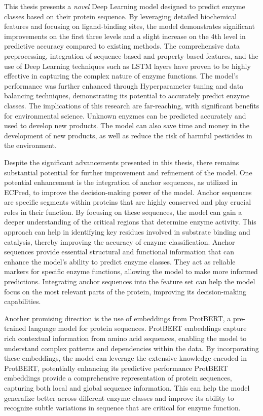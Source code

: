 This thesis presents a \textit{novel} Deep Learning model designed to predict enzyme classes based on their protein sequence. By leveraging detailed biochemical features and focusing on ligand-binding sites, the model demonstrates significant improvements on the first three levels and a slight increase on the 4th level in predictive accuracy compared to existing methods. The comprehensive data preprocessing, integration of sequence-based and property-based features, and the use of Deep Learning techniques such as LSTM layers have proven to be highly effective in capturing the complex nature of enzyme functions. The model's performance was further enhanced through Hyperparameter tuning and data balancing techniques, demonstrating its potential to accurately predict enzyme classes. The implications of this research are far-reaching, with significant benefits for environmental science. Unknown enyzmes can be predicted accurately and used to develop new products. The model can also save time and money in the development of new products, as well as reduce the risk of harmful pesticides in the environment.

Despite the significant advancements presented in this thesis, there remains substantial potential for further improvement and refinement of the model. One potential enhancement is the integration of anchor sequences, as utilized in ECPred, to improve the decision-making power of the model. Anchor sequences are specific segments within proteins that are highly conserved and play crucial roles in their function. By focusing on these sequences, the model can gain a deeper understanding of the critical regions that determine enzyme activity. This approach can help in identifying key residues involved in substrate binding and catalysis, thereby improving the accuracy of enzyme classification. Anchor sequences provide essential structural and functional information that can enhance the model's ability to predict enzyme classes. They act as reliable markers for specific enzyme functions, allowing the model to make more informed predictions. Integrating anchor sequences into the feature set can help the model focus on the most relevant parts of the protein, improving its decision-making capabilities.

Another promising direction is the use of embeddings from ProtBERT, a pre-trained language model for protein sequences. ProtBERT embeddings capture rich contextual information from amino acid sequences, enabling the model to understand complex patterns and dependencies within the data. By incorporating these embeddings, the model can leverage the extensive knowledge encoded in ProtBERT, potentially enhancing its predictive performance ProtBERT embeddings provide a comprehensive representation of protein sequences, capturing both local and global sequence information. This can help the model generalize better across different enzyme classes and improve its ability to recognize subtle variations in sequence that are critical for enzyme function.

